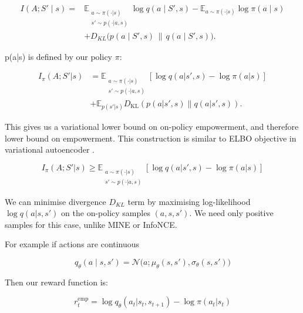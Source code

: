 \begin{equation}
\begin{aligned}
I(A;S'\mid s)
={}&\mathbb{E}_{\substack{
      a \sim \pi(\cdot|s) \\
      s' \sim p(\cdot|a,s)
    }}\log q(a\mid S',s)
-\mathbb{E}_{a \sim \pi(\cdot|s)}\log \pi(a\mid s) \\
&+D_{KL}\bigl(p(a\mid S',s)\,\|\,q(a\mid S',s)\bigr).
\end{aligned}
\label{eq:inverse-model-bound-decomposition}
\end{equation}

p(a|s) is defined by our policy $\pi$:

\begin{equation}
\begin{aligned}
I_\pi(A;S'|s)
&= \mathbb{E}_{\substack{
      a \sim \pi(\cdot|s) \\
      s' \sim p(\cdot|a,s)
    }} \left[ \log q(a|s',s)-\log\pi(a|s) \right] \\
&+ \mathbb{E}_{p(s'|s)}
	D_{\mathrm{KL}}
	\left(
	p(a|s',s)\|q(a|s',s)
	\right).
\end{aligned}
\end{equation}

This gives us a variational lower bound on on-policy empowerment, and therefore lower bound on empowerment. This construction is similar to ELBO objective in variational autoencoder \cite{kingma2014autoencoding,doersch2016tutorial}.

\begin{equation}
I_\pi(A;S'|s)\geq
\mathbb{E}_{\substack{
  a \sim \pi(\cdot|s) \\
  s' \sim p(\cdot|a,s)
}}
\left[ \log q(a|s',s)-\log\pi(a|s) \right]
\label{eq:inverse-model-variational-bound}
\end{equation}


We can minimise divergence $D_{KL}$ term by maximising log-likelihood $\log q(a | s, s')$ on the on-policy samples $(a, s, s')$. We need only positive samples for this case, unlike MINE or InfoNCE.

For example if actions are continuous

\begin{equation}
q_{\theta}(a\mid s,s') = \mathcal{N}\bigl(a;\mu_{\theta}(s,s'),\sigma_{\theta}(s, s')\bigr)
\label{eq:inverse-model-gaussian}
\end{equation}

Then our reward function is:

\begin{equation}
r_t^{\mathrm{emp}}=\log q_{\theta}(a_t|s_t,s_{t+1})-\log\pi(a_t|s_t)
\label{eq:inverse-empowerment-reward}
\end{equation}

